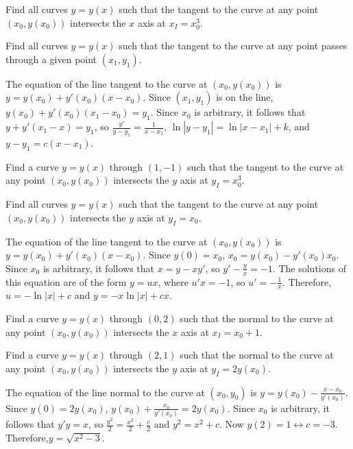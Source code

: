 \documentclass{ximera}
\begin{document}
\begin{problem}\label{exer:4.5.19}
Find all curves $y=y(x)$ such that the tangent to the curve at any
point $(x_0,y(x_0))$ intersects the $x$ axis at $x_I=x^3_0$.
\end{problem}

\begin{problem}\label{exer:4.5.20}
Find all curves $y=y(x)$ such that the tangent to the curve at any
point passes through a given point $(x_1,y_1)$.

\begin{solution}
The equation of the line tangent to the curve at $(x_0,y(x_0))$ is
$y=y(x_0)+y'(x_0)(x-x_0)$. Since $(x_1,y_1)$ is on the line,
$y(x_0)+y'(x_0)(x_1-x_0)=y_1$. Since $x_0$ is arbitrary, it follows
that $y+y'(x_1-x)=y_1$, so $\frac{y'}{y-y_1}=\frac{1}{x-x_1}$,
$\ln|y-y_1|=\ln|x-x_1|+k$, and $y-y_1=c(x-x_1)$.
\end{solution}
\end{problem}

\begin{problem}\label{exer:4.5.21}
Find a curve $y=y(x)$ through $(1,-1)$ such that the tangent to the
curve at any point $(x_0,y(x_0))$ intersects the $y$ axis at
$y_I=x^3_0$.
\end{problem}

\begin{problem}\label{exer:4.5.22}
Find all curves $y=y(x)$ such that the tangent to the curve at any
point $(x_0,y(x_0))$ intersects the $y$ axis at $y_I=x_0$.

\begin{solution}
The equation of the line tangent to the curve at $(x_0,y(x_0))$ is
$y=y(x_0)+y'(x_0)(x-x_0)$. Since $y(0)=x_0$, $x_0=y(x_0)-y'(x_0)x_0$.
Since $x_0$ is arbitrary, it follows that $x=y-xy'$, so
$y'-\frac{y}{x}=-1$. The solutions of this equation are of the form $y=ux$,
where $u'x=-1$, so $u'=-\frac{1}{x}$. Therefore,$u=-\ln|x|+c$ and
$y=-x\ln|x|+cx$.
\end{solution}
\end{problem}

\begin{problem}\label{exer:4.5.23}
Find a curve $y=y(x)$ through $(0,2)$ such that the normal to the
curve at any point $(x_0,y(x_0))$ intersects the $x$ axis at
$x_I=x_0+1$.
\end{problem}

\begin{problem}\label{exer:4.5.24}
Find a curve $y=y(x)$ through $(2,1)$ such that the normal to the
curve at any point $(x_0,y(x_0))$ intersects the $y$ axis at
$y_I=2y(x_0)$.

\begin{solution}
The equation of the line normal to the curve at $(x_0,y_0)$ is
$y=y(x_0)-\frac{x-x_0}{y'(x_0)}$. Since $y(0)=2y(x_0)$,
$y(x_0)+\frac{x_0}{y'(x_0)}=2y(x_0)$. Since $x_0$ is arbitrary, it
follows that $y'y=x$, so
$\frac{y^2}{2}=\frac{x^2}{2}+\frac{c}{2}$ and $y^2=x^2+c$. Now
$y(2)=1\leftrightarrow c=-3$. Therefore,$y=\sqrt{x^2-3}$.
\end{solution}
\end{problem}
\end{document}

